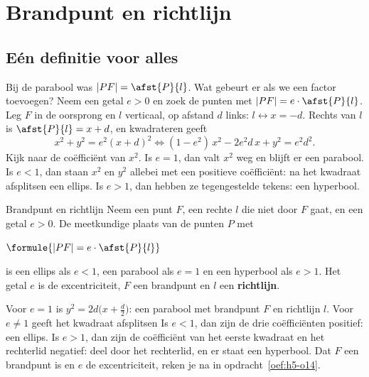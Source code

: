 \begin{oefeningen}[Start]

\end{oefeningen}

\section{Brandpunt en richtlijn}

\subsection{Eén definitie voor alles}

Bij de parabool was $|PF| = \afst{P}{l}$. Wat gebeurt er als we een factor toevoegen? Neem een getal $e > 0$ en zoek de punten met $|PF| = e \cdot \afst{P}{l}$. Leg $F$ in de oorsprong en $l$ verticaal, op afstand $d$ links: $l \leftrightarrow x = -d$. Rechts van $l$ is $\afst{P}{l} = x + d$, en kwadrateren geeft
\[ x^2 + y^2 = e^2(x + d)^2 \iff (1 - e^2)\,x^2 - 2e^2d\,x + y^2 = e^2d^2 . \]
Kijk naar de coëfficiënt van $x^2$. Is $e = 1$, dan valt $x^2$ weg en blijft er een parabool. Is $e < 1$, dan staan $x^2$ en $y^2$ allebei met een positieve coëfficiënt: na het kwadraat afsplitsen een ellips. Is $e > 1$, dan hebben ze tegengestelde tekens: een hyperbool.

\begin{theorie}
\begin{stelling}{Brandpunt en richtlijn}
Neem een punt $F$, een rechte $l$ die niet door $F$ gaat, en een getal $e > 0$. De meetkundige plaats van de punten $P$ met

\vspace{1mm}
\qquad $\formule{|PF| = e \cdot \afst{P}{l}}$

\vspace{1mm}
is een ellips als $e < 1$, een parabool als $e = 1$ en een hyperbool als $e > 1$. Het getal $e$ is de excentriciteit, $F$ een brandpunt en $l$ een \textbf{\textcolor{accent}{richtlijn}}.
\end{stelling}

\begin{bewijs}
Voor $e = 1$ is $y^2 = 2d\bigl(x + \tfrac d2\bigr)$: een parabool met brandpunt $F$ en richtlijn $l$. Voor $e \neq 1$ geeft het kwadraat afsplitsen
Is $e < 1$, dan zijn de drie coëfficiënten positief: een ellips. Is $e > 1$, dan zijn de coëfficiënt van het eerste kwadraat en het rechterlid negatief: deel door het rechterlid, en er staat een hyperbool. Dat $F$ een brandpunt is en $e$ de excentriciteit, reken je na in opdracht~\ref{oef:h5-o14}.
\end{bewijs}
\end{theorie}

